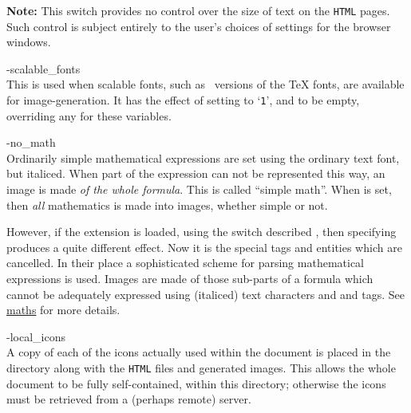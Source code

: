 \begin{htmllist}
\begin{changebar}
\smallskip\noindent
\textbf{Note: }This switch provides no control over the size of text
on the \texttt{HTML} pages.
Such control is subject entirely to the user's choices
of settings for the browser windows.
\end{changebar}%

%

\begin{changebar}
\item [ -scalable\_fonts\label{cs_scalefonts}]
\\
This is used when scalable fonts, such as \PS\ versions
of the \TeX{} fonts, are available for image-generation.\html{\\}
It has the effect of setting  to `\texttt{1}',
and  to be empty,
overriding any  for these variables.

%

\item [ -no\_math\label{cs_nomath}]
\\
Ordinarily simple mathematical expressions are set using the ordinary text font,
but italiced. When part of the expression can not be represented this way,
an image is made \emph{of the whole formula}.
This is called ``simple math''.
When  is set,
then \emph{all} mathematics is made into images, whether simple or not.

However, if the  extension is loaded,
using the  switch described ,
then specifying  produces a quite different effect.
Now it is the special  tags and entities which are cancelled.
In their place a sophisticated scheme for parsing mathematical expressions
is used. Images are made of those sub-parts of a formula which cannot be
adequately expressed using (italiced) text characters and  and
 tags.
See \hyperref{the subsection on mathematics}{Section~}{}{maths} for more details.

%

\item [-local\_icons\label{cs_localicons}]
\\
A copy of each of the icons actually used within the document is placed in the
directory along with the \texttt{HTML} files and generated images.
This allows the whole document to be fully self-contained, within this directory;
otherwise the icons must be retrieved from a (perhaps remote) server.
\end{changebar}


\end{htmllist}
